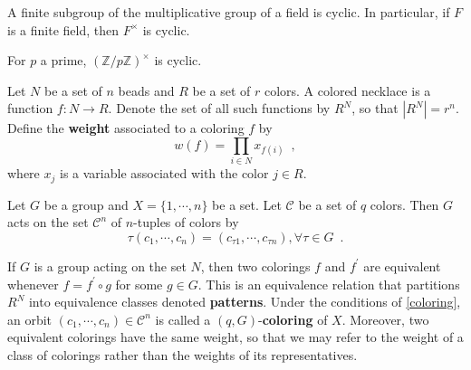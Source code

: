 \begin{proposition}
	\cite[314]{DummitFoote2004}
	A finite subgroup of the multiplicative group of a field is cyclic. In particular,
	if $F$ is a finite field, then $F^\times$ is cyclic.
\end{proposition}

\begin{corollary}
	\cite[314]{DummitFoote2004}
	For $p$ a prime, $(\mathbb{Z} / p \mathbb{Z})^\times$ is cyclic.
\end{corollary}

\begin{definition}
	\cite[85]{Aigner2007}
	Let $N$ be a set of $n$ beads and $R$ be a set of $r$ colors. A colored necklace is
	a function $f : N \to R$. Denote the set of all such functions by $R^N$, so that
	$|R^N| = r^n$. Define the \textbf{weight} associated to a coloring $f$ by
	\begin{equation}
		w(f) = \prod_{i \in N} x_{f(i)} \enspace,
	\end{equation}
	where $x_j$ is a variable associated with the color $j \in R$.
\end{definition}

\begin{proposition}
	\label{coloring}
	\cite[110]{Rotman1967}
	Let $G$ be a group and $X = \{ 1, \cdots, n \}$ be a set. Let $\mathcal{C}$ be a set
	of $q$ colors. Then $G$ acts on the set $\mathcal{C}^n$ of $n$-tuples of colors by
	\begin{equation}
		\tau(c_1, \cdots, c_n) = (c_{\tau 1}, \cdots, c_{\tau n}),
		\forall \tau \in G \enspace.
	\end{equation}
\end{proposition}

\begin{proposition}
	\cite[85]{Aigner2007}
	\cite[110]{Rotman1967}
	If $G$ is a group acting on the set $N$, then two colorings $f$ and $f^\prime$
	are equivalent whenever $f = f^\prime \circ g$ for some $g \in G$. This is an
	equivalence relation that partitions $R^N$ into equivalence classes denoted
	\textbf{patterns}. Under the conditions of \ref{coloring}, an orbit
	$(c_1, \cdots, c_n) \in \mathcal{C}^n$ is called a $(q, G)$-\textbf{coloring} of $X$.
	Moreover, two equivalent colorings have the same weight, so that we may refer to
	the weight of a class of colorings rather than the weights of its representatives.
\end{proposition}

